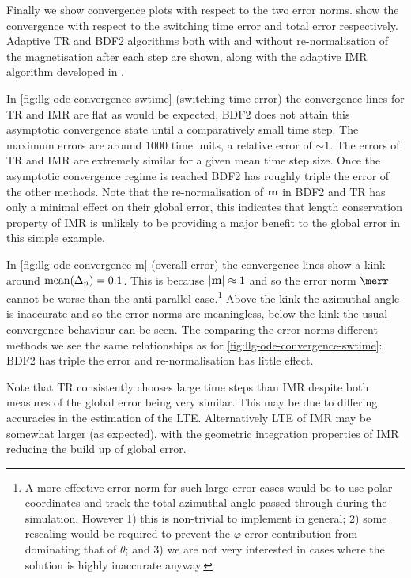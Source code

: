 Finally we show convergence plots with respect to the two error norms.
 show the convergence with respect to the switching time error and total error respectively.
Adaptive TR and BDF2 algorithms both with and without re-normalisation of the magnetisation after
each step are shown, along with the adaptive IMR algorithm developed in .


In \cref{fig:llg-ode-convergence-swtime} (switching time error) the convergence lines for TR and IMR are flat as would be expected, BDF2 does not attain this asymptotic convergence state until a comparatively small time step.
The maximum errors are around $1000$ time units, a relative error of $\sim 1$.
The errors of TR and IMR are extremely similar for a given mean time step size.
Once the asymptotic convergence regime is reached BDF2 has roughly triple the error of the other methods.
Note that the re-normalisation of $\boldsymbol{\mathrm{m}}$ in BDF2 and TR has only a minimal effect on their global error, this indicates that length conservation property of IMR is unlikely to be providing a major benefit to the global error in this simple example.


In \cref{fig:llg-ode-convergence-m} (overall error) the convergence lines show a kink around $\operatorname{mean}(\Delta_{n}) = 0.1$.
This is because $\left|{\boldsymbol{\mathrm{m}}} \right| \approx 1$ and so the error norm $\merr$ cannot be worse than the anti-parallel case.\footnote{A more effective error norm for such large error cases would be to use polar coordinates and track the total azimuthal angle passed through during the simulation. However 1) this is non-trivial to implement in general; 2) some rescaling would be required to prevent the $\varphi$ error contribution from dominating that of $\theta$; and 3) we are not very interested in cases where the solution is highly inaccurate anyway.}
Above the kink the azimuthal angle is inaccurate and so the error norms are meaningless, below the kink the usual convergence behaviour can be seen.
The comparing the error norms different methods we see the same relationships as for \cref{fig:llg-ode-convergence-swtime}: BDF2 has triple the error and re-normalisation has little effect.


Note that TR consistently chooses large time steps than IMR despite both measures of the global error being very similar.
This may be due to differing accuracies in the estimation of the LTE.
Alternatively LTE of IMR may be somewhat larger (as expected), with the geometric integration properties of IMR reducing the build up of global error.


